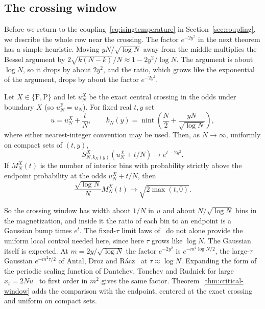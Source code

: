 \subsection{The crossing window}\label{sec:window}

Before we return to the coupling~\eqref{eq:isingtemperature} in
Section~\ref{sec:coupling}, we describe the whole row near the crossing. The factor $e^{-2y^2}$ in
the next theorem has a simple heuristic. Moving $yN/\sqrt{\log N}$ away from
the middle multiplies the Bessel argument
by $2\sqrt{k(N-k)}/N\approx1-2y^2/\log N$. The argument is about $\log N$, so
it drops by about $2y^2$, and the ratio, which grows like the exponential of the argument,
drops by about the factor $e^{-2y^2}$.

\begin{theorem}\label{thm:critical-window}
Let $X\in\{\mathrm F,\mathrm P\}$ and let $u_N^X$ be the exact central
crossing in the odds under boundary $X$ (so $u_N^{\mathrm F}=u_N$). For fixed real $t,y$ set
\[
u=u_N^X+\frac tN,\qquad
k_N(y)=\operatorname{nint}\!\left(\frac N2+\frac{yN}{\sqrt{\log N}}\right),
\]
where either nearest-integer convention may be used. Then, as $N\to\infty$,
uniformly on compact sets of $(t,y)$,
\begin{equation}\label{eq:criticalprofile}
S^X_{N,k_N(y)}(u_N^X+t/N)\longrightarrow e^{t-2y^2}.
\end{equation}
If $M_N^X(t)$ is the number of interior bins with probability strictly above
the endpoint probability at the odds $u_N^X+t/N$, then
\begin{equation}\label{eq:criticalcount}
\frac{\sqrt{\log N}}N M_N^X(t)\longrightarrow\sqrt{2\max(t,0)}.
\end{equation}
\end{theorem}

So the crossing window has width about $1/N$ in $u$ and about
$N/\sqrt{\log N}$ bins in the magnetization, and inside it the ratio of each bin to an endpoint is a
Gaussian bump times $e^t$. The fixed-$\tau$ limit laws of~\cite{antal2004,herrmann2010} do not
alone provide the uniform local control needed here, since here $\tau$ grows like $\log N$. The
Gaussian itself is expected. At $m=2y/\sqrt{\log N}$ the factor $e^{-2y^2}$ is
$e^{-m^2\log N/2}$, the large-$\tau$ Gaussian $e^{-m^2\tau/2}$ of Antal, Droz
and R\'acz~\cite[Section~4.5, Eq.~(51)]{antal2004} at $\tau\approx\log N$.
Expanding the form of the periodic scaling function of Dantchev, Tonchev and
Rudnick for large $x_t=2Nu$~\cite[Eq.~(4.14)]{dantchev2023} to first order in
$m^2$ gives the same factor.
Theorem~\ref{thm:critical-window} adds the comparison with the endpoint,
centered at the exact crossing and uniform on compact sets.

